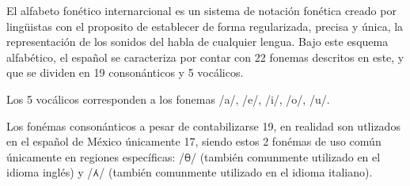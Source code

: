 \hfill \break
\justifying
El alfabeto fonético internarcional es un sistema de notación fonética creado por lingüistas con el proposito de establecer de forma regularizada, precisa y única, la representación de los sonidos del habla de cualquier lengua. Bajo este esquema alfabético, el español se caracteriza por contar con 22 fonemas descritos en este, y que se dividen en 19 consonánticos y 5 vocálicos.

\hfill \break
\justifying
Los 5 vocálicos corresponden a los fonemas /a/, /e/, /i/, /o/, /u/.

\hfill \break
\justifying
Los fonémas consonánticos a pesar de contabilizarse 19, en realidad son utlizados en el español de México únicamente 17, siendo estos 2 fonémas de uso común únicamente en regiones específicas: /\includegraphics[width=6pt]{Imagenes/fricativa_dental_sorda.png}/ (también comunmente utilizado en el idioma inglés) y /\includegraphics[width=6pt]{Imagenes/aproximante_lateral_palatal.png}/ (también comunmente utilizado en el idioma italiano).

